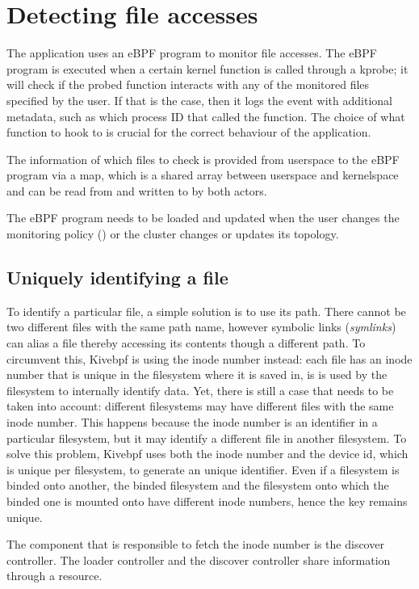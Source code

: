 \section{Detecting file accesses}

The application uses an eBPF program to monitor file accesses. The eBPF program
is executed when a certain kernel function is called through a kprobe; it will
check if the probed function interacts with any of the monitored files specified
by the user. If that is the case, then it logs the event with additional
metadata, such as which process ID that called the function. The choice of what
function to hook to is crucial for the correct behaviour of the application.

The information of which files to check is provided from userspace to the eBPF
program via a map, which is a shared array between userspace and kernelspace and
can be read from and written to by both actors.

The eBPF program needs to be loaded and updated when the user changes the
monitoring policy () or the cluster changes or updates its
topology.

\subsection{Uniquely identifying a file}

To identify a particular file, a simple solution is to use its path. There
cannot be two different files with the same path name, however symbolic links
(\textit{symlinks}) can alias a file thereby accessing its contents though a
different path. To circumvent this, Kivebpf is using the inode number instead:
each file has an inode number that is unique in the filesystem where it is saved
in, is is used by the filesystem to internally identify data. Yet, there is
still a case that needs to be taken into account: different filesystems may have
different files with the same inode number. This happens because the inode
number is an identifier in a particular filesystem, but it may identify a
different file in another filesystem. To solve this problem, Kivebpf uses both
the inode number and the device id, which is unique per filesystem, to generate
an unique identifier. Even if a filesystem is binded onto another, the binded
filesystem and the filesystem onto which the binded one is mounted onto have
different inode numbers, hence the key remains unique.

The component that is responsible to fetch the inode number is the discover
controller. The loader controller and the discover controller share information
through a  resource.

